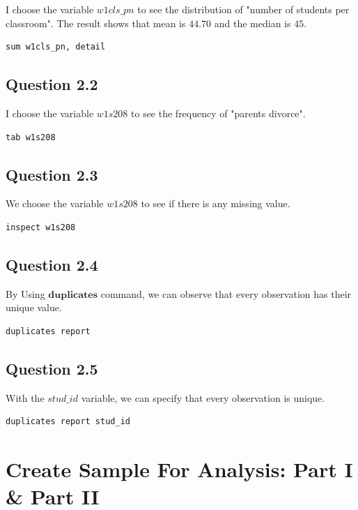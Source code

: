 \documentclass[11pt, letterpaper]{article}
\begin{document}
I choose the variable $\textit{w1cls\_pn}$ to see the distribution of "number of students per classroom".  The result shows that mean is $44.70$ and the median is $45$.

\begin{lstlisting}
sum w1cls_pn, detail
\end{lstlisting}


\subsection*{Question 2.2}

I choose the variable $\textit{w1s208}$ to see the frequency of "parents divorce". 

\begin{lstlisting}
tab w1s208
\end{lstlisting}


\subsection*{Question 2.3}

We choose the variable $\textit{w1s208}$ to see if there is any missing value.

\begin{lstlisting}
inspect w1s208
\end{lstlisting}


\subsection*{Question 2.4}

By Using $\textbf{duplicates}$ command, we can observe that every observation has their unique value.

\begin{lstlisting}
duplicates report
\end{lstlisting}


\subsection*{Question 2.5}

With the $\textit{stud\_id}$ variable, we can specify that every observation is unique.

\begin{lstlisting}
duplicates report stud_id
\end{lstlisting}



\section{Create Sample For Analysis: Part I \& Part II}
\end{document}
